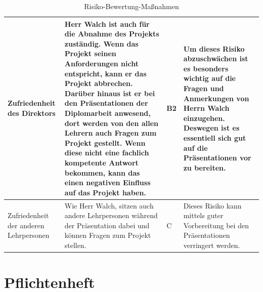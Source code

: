 \begin{table}[H]
	\centering	
		\renewcommand{\arraystretch}{1.5}
	\begin{tabular}{|p{3cm}|p{5cm}|p{2cm}|p{5cm}|}
		\hline
		Zufriedenheit des Direktors & Herr Walch ist auch für die Abnahme des Projekts zuständig. Wenn das Projekt seinen Anforderungen nicht entspricht, kann er das Projekt abbrechen. Darüber hinaus ist er bei den Präsentationen der Diplomarbeit anwesend, dort werden von den allen Lehrern auch Fragen zum Projekt gestellt. Wenn diese nicht eine fachlich kompetente Antwort bekommen, kann das einen negativen Einfluss auf das Projekt haben. & B2 & Um dieses Risiko abzuschwächen ist es besonders wichtig auf die Fragen und Anmerkungen von Herrn Walch einzugehen. Deswegen ist es essentiell sich gut auf die Präsentationen vor zu bereiten.\\
		\hline
		Zufriedenheit der anderen Lehrpersonen & Wie Herr Walch, sitzen auch andere Lehrpersonen während der Präsentation dabei und können Fragen zum
		Projekt stellen.
		 & C & Dieses Risiko kann mittels guter Vorbereitung bei den Präsentationen verringert werden. \\
		\hline
	\end{tabular}
		\caption{Risiko-Bewertung-Maßnahmen}
\label{Risiko}
\end{table}
\newpage
\section{Pflichtenheft}
\def \currentAuthor {Michael Leitner}
